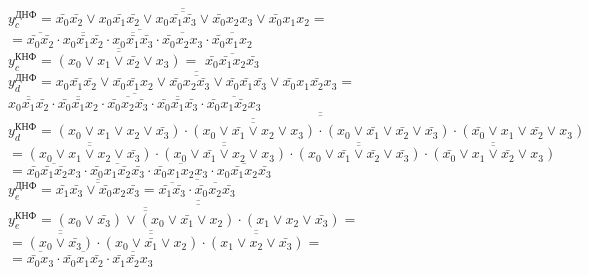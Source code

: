 \documentclass{bmstu}
\begin{document}
	$y^{\text{ДНФ}}_c = \overline{\overline{\bar{x_0} \bar{x_2} \vee x_0 \bar{x_1} \bar{x_2} \vee x_0 \bar{x_1} \bar{x_3} \vee\bar{x_0} x_2 x_3 \vee\bar{x_0} x_1 x_2}} =$ \\
	$= \overline{\overline{\bar{x_0} \bar{x_2}} \cdot\overline{x_0 \bar{x_1} \bar{x_2}} \cdot\overline{x_0 \bar{x_1} \bar{x_3}} \cdot\overline{\bar{x_0} x_2 x_3} \cdot \overline{\bar{x_0} x_1 x_2}}$ \\
	$y^{\text{КНФ}}_c = \overline{\overline{(x_0 \vee x_1 \vee \bar{x_2} \vee x_3)}} =$ $ \overline{\bar{x_0} \bar{x_1} x_2 \bar{x_3}}$ \\
	
	$y^{\text{ДНФ}}_d = \overline{\overline{x_0 \bar{x_1} \bar{x_2} \vee\bar{x_0} \bar{x_1} x_2 \vee\bar{x_0} x_2 \bar{x_3} \vee\bar{x_0} \bar{x_1} \bar{x_3} \vee\bar{x_0} x_1 \bar{x_2} x_3}} =$ \\
	$\overline{\overline{x_0 \bar{x_1} \bar{x_2}} \cdot \overline{\bar{x_0} \bar{x_1} x_2} \cdot \overline{\bar{x_0} x_2 \bar{x_3}} \cdot \overline{\bar{x_0} \bar{x_1} \bar{x_3}} \cdot \overline{\bar{x_0} x_1 \bar{x_2} x_3}}$ \\
	$y^{\text{КНФ}}_d = \overline{\overline{\overline{\overline{(x_0 \vee x_1 \vee x_2 \vee \bar{x_3}) \cdot(x_0 \vee \bar{x_1} \vee x_2 \vee x_3) \cdot(x_0 \vee \bar{x_1} \vee \bar{x_2} \vee \bar{x_3})}} \cdot (\bar{x_0} \vee x_1 \vee \bar{x_2} \vee x_3)}}$ \\
	$= \overline{\overline{(x_0 \vee x_1 \vee x_2 \vee \bar{x_3})}} \cdot \overline{\overline{(x_0 \vee \bar{x_1} \vee x_2 \vee x_3)}} \cdot\overline{\overline{(x_0 \vee \bar{x_1} \vee \bar{x_2} \vee \bar{x_3})}} \cdot \overline{\overline{(\bar{x_0} \vee x_1 \vee \bar{x_2} \vee x_3)}}$ \\
	$= \overline{\bar{x_0} \bar{x_1} \bar{x_2} x_3} \cdot \overline{\bar{x_0} x_1 \bar{x_2} \bar{x_3}} \cdot \overline{\bar{x_0} x_1 x_2 x_3} \cdot \overline{x_0 \bar{x_1} x_2 \bar{x_3}}$ \\
	
	$y^{\text{ДНФ}}_e = \overline{\overline{\bar{x_1} \bar{x_3} \vee \bar{x_0} x_2 \bar{x_3}}} = \overline{\overline{\bar{x_1} \bar{x_3}} \cdot \overline{\bar{x_0} x_2 \bar{x_3}}}$ \\
	$y^{\text{КНФ}}_e = \overline{\overline{\overline{\overline{(x_0 \vee \bar{x_3}) \vee (x_0 \vee \bar{x_1} \vee x_2)}} \cdot (x_1 \vee x_2 \vee \bar{x_3})}} =$ \\
	$= \overline{\overline{(x_0 \vee \bar{x_3})}} \cdot \overline{\overline{(x_0 \vee \bar{x_1} \vee x_2)}} \cdot \overline{\overline{(x_1 \vee x_2 \vee \bar{x_3})}} =$ \\
	$= \overline{\bar{x_0} x_3} \cdot \overline{\bar{x_0} x_1 \bar{x_2}} \cdot \overline{\bar{x_1} \bar{x_2} x_3}$ \\
	
\end{document}
